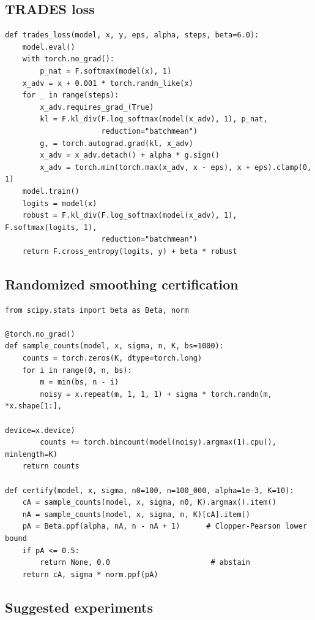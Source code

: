 \documentclass[10pt,a4paper]{extarticle}
\theoremstyle{definition}
\begin{document}
\subsection{TRADES loss}

\begin{lstlisting}
def trades_loss(model, x, y, eps, alpha, steps, beta=6.0):
    model.eval()
    with torch.no_grad():
        p_nat = F.softmax(model(x), 1)
    x_adv = x + 0.001 * torch.randn_like(x)
    for _ in range(steps):
        x_adv.requires_grad_(True)
        kl = F.kl_div(F.log_softmax(model(x_adv), 1), p_nat,
                      reduction="batchmean")
        g, = torch.autograd.grad(kl, x_adv)
        x_adv = x_adv.detach() + alpha * g.sign()
        x_adv = torch.min(torch.max(x_adv, x - eps), x + eps).clamp(0, 1)
    model.train()
    logits = model(x)
    robust = F.kl_div(F.log_softmax(model(x_adv), 1), F.softmax(logits, 1),
                      reduction="batchmean")
    return F.cross_entropy(logits, y) + beta * robust
\end{lstlisting}

\subsection{Randomized smoothing certification}

\begin{lstlisting}
from scipy.stats import beta as Beta, norm

@torch.no_grad()
def sample_counts(model, x, sigma, n, K, bs=1000):
    counts = torch.zeros(K, dtype=torch.long)
    for i in range(0, n, bs):
        m = min(bs, n - i)
        noisy = x.repeat(m, 1, 1, 1) + sigma * torch.randn(m, *x.shape[1:],
                                                           device=x.device)
        counts += torch.bincount(model(noisy).argmax(1).cpu(), minlength=K)
    return counts

def certify(model, x, sigma, n0=100, n=100_000, alpha=1e-3, K=10):
    cA = sample_counts(model, x, sigma, n0, K).argmax().item()
    nA = sample_counts(model, x, sigma, n, K)[cA].item()
    pA = Beta.ppf(alpha, nA, n - nA + 1)      # Clopper-Pearson lower bound
    if pA <= 0.5:
        return None, 0.0                       # abstain
    return cA, sigma * norm.ppf(pA)
\end{lstlisting}

\subsection{Suggested experiments}
\end{document}
